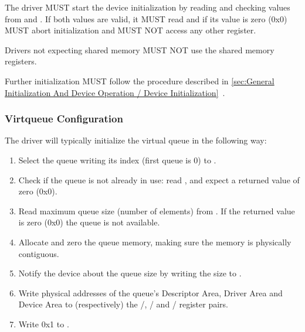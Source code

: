 The driver MUST start the device initialization by reading and
checking values from  and .
If both values are valid, it MUST read 
and if its value is zero (0x0) MUST abort initialization and
MUST NOT access any other register.

Drivers not expecting shared memory MUST NOT use the shared
memory registers.

Further initialization MUST follow the procedure described in
\ref{sec:General Initialization And Device Operation / Device Initialization}~.

\subsubsection{Virtqueue Configuration}\label{sec:Virtio Transport Options / Virtio Over MMIO / MMIO-specific Initialization And Device Operation / Virtqueue Configuration}

The driver will typically initialize the virtual queue in the following way:

\begin{enumerate}
\item Select the queue writing its index (first queue is 0) to
   .

\item Check if the queue is not already in use: read ,
   and expect a returned value of zero (0x0).

\item Read maximum queue size (number of elements) from
   . If the returned value is zero (0x0) the
   queue is not available.

\item Allocate and zero the queue memory, making sure the memory
   is physically contiguous.

\item Notify the device about the queue size by writing the size to
   .

\item Write physical addresses of the queue's Descriptor Area,
   Driver Area and Device Area to (respectively) the
   /,
   / and
   / register pairs.

\item Write 0x1 to .
\end{enumerate}

